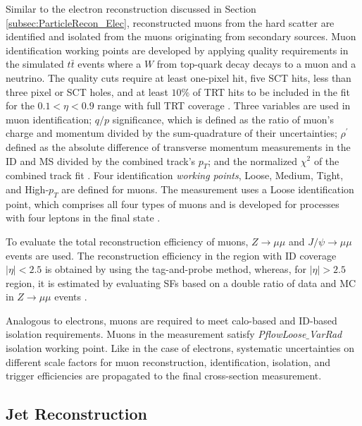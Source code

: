 Similar to the electron reconstruction discussed in Section \ref{subsec:ParticleRecon_Elec}, reconstructed muons from the hard scatter are identified and isolated from the muons originating from secondary sources. Muon identification working points are developed by applying quality requirements in the simulated $t\bar{t}$ events where a $W$ from top-quark decay decays to a muon and a neutrino. The quality cuts require at least one-pixel hit, five SCT hits, less than three pixel or SCT holes, and at least $10\%$ of TRT hits to be included in the fit for the $0.1<\eta<0.9$ range with full TRT coverage \cite{MuonReco}. Three variables are used in muon identification; $q/p$ significance, which is defined as the ratio of muon's charge and momentum divided by the sum-quadrature of their uncertainties; $\rho^{'}$ defined as the absolute difference of transverse momentum measurements in the ID and MS divided by the combined track's $p_{T}$; and the normalized $\chi ^{2}$ of the combined track fit \cite{MuonReco}. 
Four identification \textit{working points}, Loose, Medium, Tight, and High-$p_{T}$ are defined for muons. The measurement uses a Loose identification point, which comprises all four types of muons and is developed for processes with four leptons in the final state  \cite{MuonReco}. 

To evaluate the total reconstruction efficiency of muons, $Z \rightarrow \mu\mu$ and $J/\psi \rightarrow \mu\mu$ events are used. The reconstruction efficiency in the region with ID coverage $|\eta|<2.5$ is obtained by using the tag-and-probe method, whereas, for $|\eta|>2.5$ region, it is estimated by evaluating SFs based on a double ratio of data and MC in $Z \rightarrow \mu\mu$ events \cite{MuonEffLargeEta}.

Analogous to electrons, muons are required to meet calo-based and ID-based isolation requirements. Muons in the measurement satisfy \textit{PflowLoose$\_$VarRad} isolation working point. Like in the case of electrons, systematic uncertainties on different scale factors for muon reconstruction, identification, isolation, and trigger efficiencies are propagated to the final cross-section measurement.

\subsection{Jet Reconstruction}
\label{subsec:ParticleRecon_Jets}

